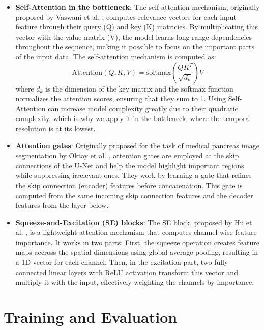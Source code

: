 \begin{itemize}
    \item \textbf{Self-Attention in the bottleneck}: The self-attention mechanism, originally proposed by Vaswani et al. \cite{vaswani2017attention}, computes relevance vectors for each input feature through their query (Q) and key (K) matricies. By multiplicating this vector with the value matrix (V), the model learns long-range dependencies throughout the sequence, making it possible to focus on the important parts of the input data. The self-attention mechanism is computed as:
    \begin{equation}
        \text{Attention}(Q, K, V) = \text{softmax}\left(\frac{QK^T}{\sqrt{d_k}}\right)V
    \end{equation}
    where $d_k$ is the dimension of the key matrix and the softmax function normalizes the attention scores, ensuring that they sum to 1.
    Using Self-Attention can increase model complexity greatly due to their quadratic complexity, which is why we apply it in the bottleneck, where the temporal resolution is at its lowest.
    \item \textbf{Attention gates}: Originally proposed for the task of medical pancreas image segmentation by Oktay et al. \cite{oktay2018attention}, attention gates are employed at the skip connections of the U-Net and help the model highlight important regions while suppressing irrelevant ones. They work by learning a gate that refines the skip connection (encoder) features before concatenation. This gate is computed from the same incoming skip connection features and the decoder features from the layer below. 
    \item \textbf{Squeeze-and-Excitation (SE) blocks}: The SE block, proposed by Hu et al. \cite{hu2018squeeze}, is a lightweight attention mechanism that computes channel-wise feature importance. It works in two parts: First, the squeeze operation creates feature maps accross the spatial dimensions using global average pooling, resulting in a 1D vector for each channel. Then, in the excitation part, two fully connected linear layers with ReLU activation transform this vector and multiply it with the input, effectively weighting the channels by importance. 
\end{itemize}


\section{Training and Evaluation}

